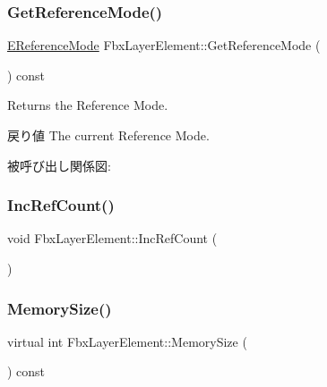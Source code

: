 \mbox{\label{class_fbx_layer_element_ae135c9331612660680a0acc97de02d60}} 
\subsubsection{\texorpdfstring{Get\+Reference\+Mode()}{GetReferenceMode()}}
{\footnotesize\ttfamily \hyperlink{class_fbx_layer_element_a00f04654580ca9b2f5d292c11abd83fc}{E\+Reference\+Mode} Fbx\+Layer\+Element\+::\+Get\+Reference\+Mode (\begin{DoxyParamCaption}{ }\end{DoxyParamCaption}) const}

Returns the Reference Mode. \begin{DoxyReturn}{戻り値}
The current Reference Mode. 
\end{DoxyReturn}
被呼び出し関係図\+:
\mbox{\label{class_fbx_layer_element_a00a11912a2cca47c811c8d23bb3ede51}} 
\subsubsection{\texorpdfstring{Inc\+Ref\+Count()}{IncRefCount()}}
{\footnotesize\ttfamily void Fbx\+Layer\+Element\+::\+Inc\+Ref\+Count (\begin{DoxyParamCaption}{ }\end{DoxyParamCaption})}

\mbox{\label{class_fbx_layer_element_a15654a170f2d2952bf1eafad65262b8b}} 
\subsubsection{\texorpdfstring{Memory\+Size()}{MemorySize()}}
{\footnotesize\ttfamily virtual int Fbx\+Layer\+Element\+::\+Memory\+Size (\begin{DoxyParamCaption}{ }\end{DoxyParamCaption}) const\hspace{0.3cm}{\ttfamily [virtual]}}



